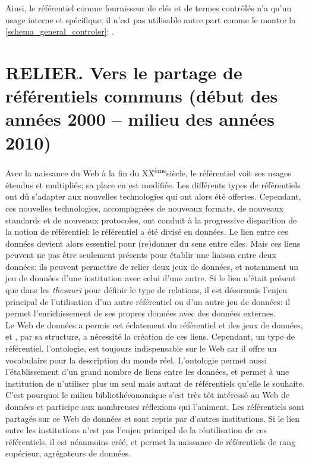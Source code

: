 \documentclass[a4paper,12pt,twoside]{book}
\newcommand{\reference}[1]{\autoref{#1}: \nameref{#1}}
\begin{document}
	Ainsi, le référentiel comme fournisseur de clés et de termes contrôlés n'a qu'un usage interne et spécifique; il n'est pas utilisable autre part comme le montre la \reference{schema_general_controler}.
	
	
	\part{\label{relier}RELIER. Vers le partage de référentiels communs (début des années 2000 – milieu des années 2010)}
	
	Avec la naissance du Web à la fin du \textsc{XX}\textsuperscript{ème}siècle, le référentiel voit ses usages étendus et multipliés; sa place en est modifiée. Les différents types de référentiels ont dû s'adapter aux nouvelles technologies qui ont alors été offertes. Cependant, ces nouvelles technologies, accompagnées de nouveaux formats, de nouveaux standards et de nouveaux protocoles, ont conduit à la progressive disparition de la notion de référentiel: le référentiel a été divisé en données. Le lien entre ces données devient alors essentiel pour (re)donner du sens entre elles. Mais ces liens peuvent ne pas être seulement présents pour établir une liaison entre deux données: ils peuvent permettre de relier deux jeux de données, et notamment un jeu de données d'une institution avec celui d'une autre. Si le lien n'était présent que dans les \textit{thesauri} pour définir le type de relations, il est désormais l'enjeu principal de l'utilisation d'un autre référentiel ou d'un autre jeu de données: il permet l'enrichissement de ses propres données avec des données externes.\\
	
	Le Web de données a permis cet éclatement du référentiel et des jeux de données, et , par sa structure, a nécessité la création de ces liens. Cependant, un type de référentiel, l'ontologie, est toujours indispensable sur le Web car il offre un vocabulaire pour la description du monde réel. L'ontologie permet aussi l'établissement d'un grand nombre de liens entre les données, et permet à une institution de n'utiliser plus un seul mais autant de référentiels qu'elle le souhaite.\\
	
	C'est pourquoi le milieu bibliothéconomique s'est très tôt intéressé au Web de données et participe aux nombreuses réflexions qui l'animent. Les référentiels sont partagés sur ce Web de données et sont repris par d'autres institutions. Si le lien entre les institutions n'est pas l'enjeu principal de la réutilisation de ces référentiels, il est néanmoins créé, et permet la naissance de référentiels de rang supérieur, agrégateurs de données.
	
\end{document}
